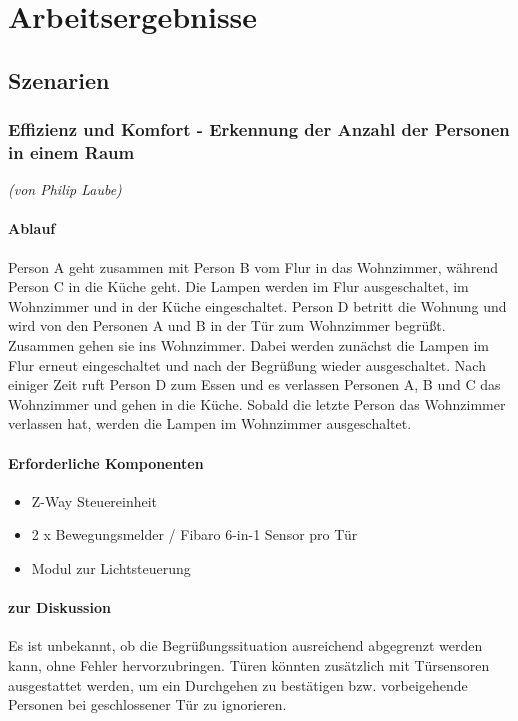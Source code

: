 \chapter{Arbeitsergebnisse}

\section{Szenarien}

\subsection{Effizienz und Komfort - Erkennung der Anzahl der Personen in einem Raum}
\label{subsec:szenarioPersonCounter}
\emph{(von Philip Laube)}
\subsubsection{Ablauf}
Person A geht zusammen mit Person B vom Flur in das Wohnzimmer, während Person C in die Küche geht.
Die Lampen werden im Flur ausgeschaltet, im Wohnzimmer und in der Küche eingeschaltet.
Person D betritt die Wohnung und wird von den Personen A und B in der Tür zum Wohnzimmer begrüßt. Zusammen gehen sie ins Wohnzimmer.
Dabei werden zunächst die Lampen im Flur erneut eingeschaltet und nach der Begrüßung wieder ausgeschaltet.
Nach einiger Zeit ruft Person D zum Essen und es verlassen Personen A, B und C das Wohnzimmer und gehen in die Küche.
Sobald die letzte Person das Wohnzimmer verlassen hat, werden die Lampen im Wohnzimmer ausgeschaltet.

\subsubsection{Erforderliche Komponenten}
\begin{itemize}
	\item Z-Way Steuereinheit
	\item 2 x Bewegungsmelder / Fibaro 6-in-1 Sensor pro Tür
	\item Modul zur Lichtsteuerung
\end{itemize}

\subsubsection{zur Diskussion}
Es ist unbekannt, ob die Begrüßungssituation ausreichend abgegrenzt werden kann, ohne Fehler hervorzubringen.
Türen könnten zusätzlich mit Türsensoren ausgestattet werden, um ein Durchgehen zu bestätigen bzw. vorbeigehende Personen bei geschlossener Tür zu ignorieren.

